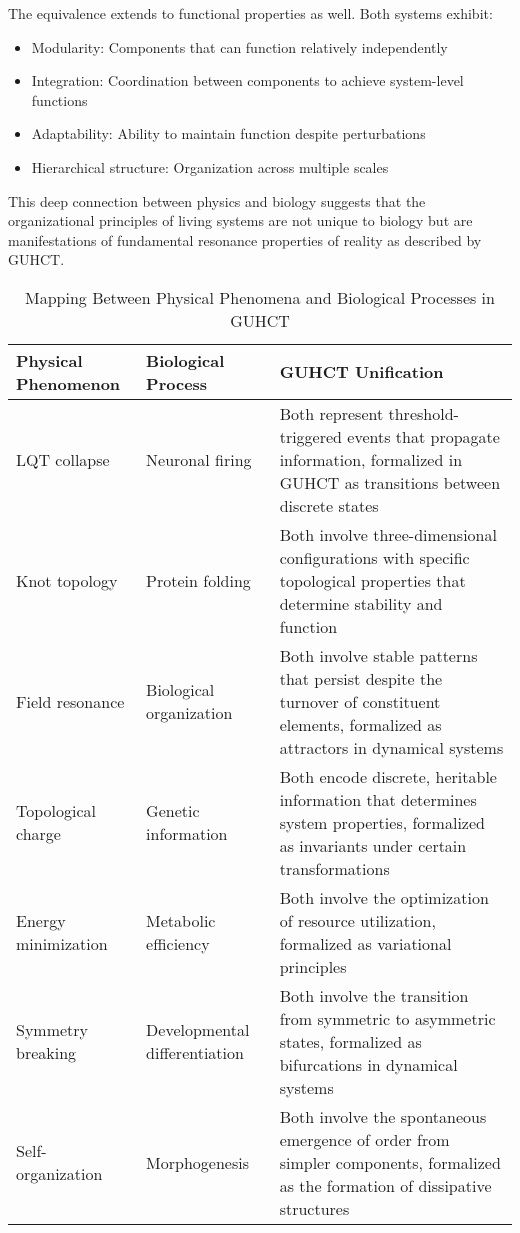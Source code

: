 \documentclass[11pt,a4paper]{article}
\makeatletter
\renewenvironment{proof}[1][\proofname]{\par
  \pushQED{\qed}%
  \normalfont \topsep6\p@\@plus6\p@\relax
  \trivlist
  \item[\hskip\labelsep
        \itshape
    #1\@addpunct{.}]\ignorespaces
}{%
  \popQED\endtrivlist\@endpefalse
}
\makeatother
\begin{document}
\begin{proof}
The equivalence extends to functional properties as well. Both systems exhibit:
\begin{itemize}
    \item Modularity: Components that can function relatively independently
    \item Integration: Coordination between components to achieve system-level functions
    \item Adaptability: Ability to maintain function despite perturbations
    \item Hierarchical structure: Organization across multiple scales
\end{itemize}

This deep connection between physics and biology suggests that the organizational principles of living systems are not unique to biology but are manifestations of fundamental resonance properties of reality as described by GUHCT.
\end{proof}

\begin{table}[h!]
\centering
\caption{Mapping Between Physical Phenomena and Biological Processes in GUHCT}
\label{tab:physics_biology_mapping}
\begin{tabular}{|p{3cm}|p{3cm}|p{8cm}|}
\hline
\textbf{Physical Phenomenon} & \textbf{Biological Process} & \textbf{GUHCT Unification} \\
\hline
LQT collapse & Neuronal firing & Both represent threshold-triggered events that propagate information, formalized in GUHCT as transitions between discrete states \\
\hline
Knot topology & Protein folding & Both involve three-dimensional configurations with specific topological properties that determine stability and function \\
\hline
Field resonance & Biological organization & Both involve stable patterns that persist despite the turnover of constituent elements, formalized as attractors in dynamical systems \\
\hline
Topological charge & Genetic information & Both encode discrete, heritable information that determines system properties, formalized as invariants under certain transformations \\
\hline
Energy minimization & Metabolic efficiency & Both involve the optimization of resource utilization, formalized as variational principles \\
\hline
Symmetry breaking & Developmental differentiation & Both involve the transition from symmetric to asymmetric states, formalized as bifurcations in dynamical systems \\
\hline
Self-organization & Morphogenesis & Both involve the spontaneous emergence of order from simpler components, formalized as the formation of dissipative structures \\
\hline
\end{tabular}
\end{table}
\end{document}
